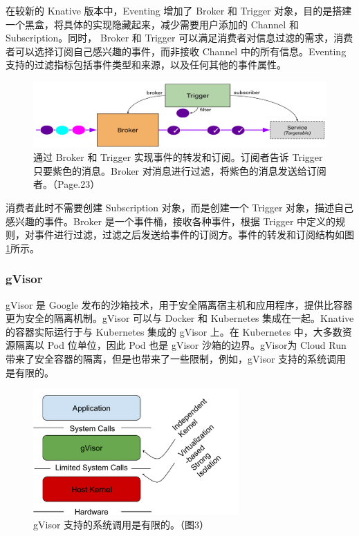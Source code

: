 \documentclass[11pt]{article}
\begin{document}
在较新的 Knative 版本中，Eventing 增加了 Broker 和 Trigger 对象，目的是搭建一个黑盒，将具体的实现隐藏起来，减少需要用户添加的 Channel 和 Subscription。同时， Broker 和 Trigger 可以满足消费者对信息过滤的需求，消费者可以选择订阅自己感兴趣的事件，而非接收 Channel 中的所有信息。Eventing 支持的过滤指标包括事件类型和来源，以及任何其他的事件属性。

\begin{figure}[!htbp]
	\centering
	\includegraphics[width=\textwidth]{figs/knative-broker_2.png}
	\caption{通过 Broker 和 Trigger 实现事件的转发和订阅。订阅者告诉 Trigger 只要紫色的消息。Broker 对消息进行过滤，将紫色的消息发送给订阅者。（\cite{knative-eventing}Page.23）}
	\label{knative-broker}
\end{figure}
消费者此时不需要创建 Subscription 对象，而是创建一个 Trigger 对象，描述自己感兴趣的事件。Broker 是一个事件桶，接收各种事件，根据 Trigger 中定义的规则，对事件进行过滤，过滤之后发送给事件的订阅方。事件的转发和订阅结构如图\ref{knative-broker}所示。

\subsubsection{gVisor}
gVisor 是 Google 发布的沙箱技术，用于安全隔离宿主机和应用程序，提供比容器更为安全的隔离机制。gVisor 可以与 Docker 和 Kubernetes 集成在一起。Knative 的容器实际运行于与 Kubernetes 集成的 gVisor 上。在 Kubernetes 中，大多数资源隔离以 Pod 位单位，因此 Pod 也是 gVisor 沙箱的边界\cite{knative-gvisor}。gVisor为 Cloud Run 带来了安全容器的隔离，但是也带来了一些限制，例如，gVisor 支持的系统调用是有限的\cite{cloudrun_contract}。
\begin{figure}[!htbp]
	\centering
	\includegraphics[width=0.7\textwidth]{figs/knative-gvisor.png}
	\caption{gVisor 支持的系统调用是有限的。（\cite{knative-gvisor}图3）}
	\label{knative-gvisor}
\end{figure}
\end{document}
